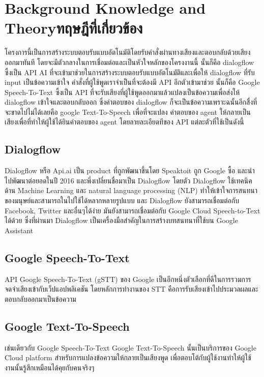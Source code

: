 \chapter{\ifenglish Background Knowledge and Theory\else ทฤษฎีที่เกี่ยวข้อง\fi}

โครงการนี้เป็นการสร้างระบบตอบรับแบบอัตโนมัติโดยรับคำสั่งผ่านทางเสียงและตอบกลับด้วยเสียงออกมาทันที
โดยจะมีตัวกลางในการเชื่อมต่อและเป็นหัวใจหลักของโครงงานนี้ นั้นก็คือ dialogflow ซึ้งเป็น API AI
ที่จะเข้ามาช่วยในการสร้างระบบตอบรับแบบอัตโนมัติและเพื่อให้ dialogflow ที่รับ input เป็นข้อความเข้าใจ
คำสั่งที่ผู้ใช้พูดเราจำเป็นที่จะต้องมี API อีกตัวเข้ามาช่วย นั้นก็คือ Google Speech-To-Text ซึ้งเป็น API
ที่จะรับเสียงที่ผู้ใช้พูดออกมาแล้วแปลงเป็นข้อความเพื่อส่งให้ dialogflow เข้าใจและตอบกลับออก ซึ่งคำตอบของ
dialogflow ก็จะเป็นข้อความเพราะฉนั้นอีกสื่งที่จะขาดไปไม่ได้เลยคือ google Text-To-Speech เพื่อที่จะแปลง
คำตอบของ agent ให้กลายเป็นเสียงเพื่อที่ทำให้ผู้ใช้ได้ยินคำตอบของ agent โดยลายละเอียดทีของ API แต่ละตัวที่ใช้เป็นดังนี้


\section{Dialogflow}
Dialogflow หรือ Api.ai เป็น product ที่ถูกพัฒนาขึ้นโดย Speaktoit ถูก Google ซื้อ และนำไปพัฒนาต่อยอดในปี
2016 และพึ่งเปลี่ยนชื่อมาเป็น Dialogflow โดยตัว Dialogflow ใช้เทคนิคด้าน Machine Learning และ natural language
processing (NLP) ทำให้เข้าใจการสนทนาของมนุษย์และสามารถในไปใช้ได้หลากหลายรูปแบบ และ Dialogflow ยังสามารถเชื่อมต่อกับ
Facebook, Twitter และอื่นๆได้ง่าย มันยังสามารถเชื่อมต่อกับ Google Cloud Speech-to-Text ได้ด้วย ซึ่งที่ผ่านมา
Dialogflow เป็นเครื่องมือสำคัญในการสร้างบทสนทนาที่ใช้บน Google Assistant

\section{Google Speech-To-Text}
API Google Speech-To-Text (gSTT) ของ Google เป็นอีกหนึ่งตัวเลือกที่ดีในการรวมการจดจำเสียงเข้ากับเว็ปแอปพลิเคชัน
โดยหลักการทำงานของ STT คือการรับเสียงเข้าไปประมวลผลและตอบกลับออกมาเป็นข้อความ

\section{Google Text-To-Speech}
เช่นเดียวกับ Google Speech-To-Text Google Text-To-Speech นั้นเป็นบริการของ Google Cloud platform
สำหรับการแปลงข้อความให้กลายเป็นเสียงพูด เพื่อตอบโต้กับผู้ใช้งานทำให้ผู้ใช้งานนั้นรู้สึกเหมือนได้คุยกับคนจริงๆ

